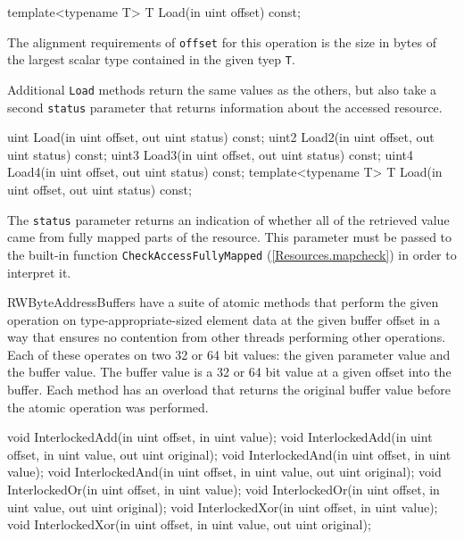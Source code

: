 \begin{HLSL}
  template<typename T>
  T Load(in uint offset) const;
\end{HLSL}

The alignment requirements of \texttt{offset} for this operation is the size in bytes of the largest
scalar type contained in the given tyep \texttt{T}.

Additional \texttt{Load} methods return the same values as the others,
but also take a second \texttt{status} parameter that returns information about the accessed resource.
\begin{HLSL}
  uint Load(in uint offset, out uint status) const;
  uint2 Load2(in uint offset, out uint status) const;
  uint3 Load3(in uint offset, out uint status) const;
  uint4 Load4(in uint offset, out uint status) const;
  template<typename T>
  T Load(in uint offset, out uint status) const;
\end{HLSL}

The \texttt{status} parameter returns an indication of whether all of the retrieved value
came from fully mapped parts of the resource.
This parameter must be passed to the built-in function \texttt{CheckAccessFullyMapped} (\ref{Resources.mapcheck})
in order to interpret it.


RWByteAddressBuffers have a suite of atomic methods that perform the given operation
on type-appropriate-sized element data at the given buffer offset
in a way that ensures no contention from other threads performing other operations.
Each of these operates on two 32 or 64 bit values: the given parameter value and the buffer value.
The buffer value is a 32 or 64 bit value at a given offset into the buffer.
Each method has an overload that returns the original buffer value before the atomic operation was performed.

\begin{HLSL}
   void InterlockedAdd(in uint offset, in uint value);
   void InterlockedAdd(in uint offset, in uint value, out uint original);
   void InterlockedAnd(in uint offset, in uint value);
   void InterlockedAnd(in uint offset, in uint value, out uint original);
   void InterlockedOr(in uint offset, in uint value);
   void InterlockedOr(in uint offset, in uint value, out uint original);
   void InterlockedXor(in uint offset, in uint value);
   void InterlockedXor(in uint offset, in uint value, out uint original);
\end{HLSL}

